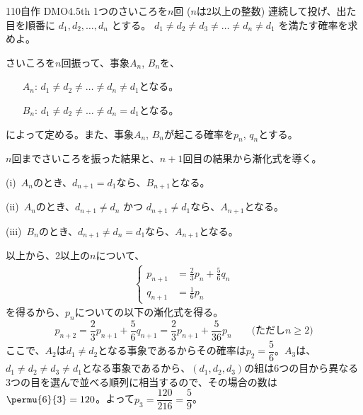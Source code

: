 \begin{thm}{110}{}{自作 DMO4.5th}
 1つのさいころを$n$回 ($n$は2以上の整数) 連続して投げ、出た目を順番に $d_1, d_2, \dots, d_n$ とする。 $d_1\neq d_2 \neq d_3 \neq \dots \neq d_n \neq d_1$ を満たす確率を求めよ。
\end{thm}

さいころを$n$回振って、事象$A_n$, $B_n$を、
\begin{itemize}
 \item[$A_n$:] $d_1\neq d_2\neq\dots\neq d_n\neq d_1$となる。 
 \item[$B_n$:] $d_1\neq d_2\neq\dots\neq d_n = d_1$となる。 
\end{itemize}
によって定める。また、事象$A_n$, $B_n$が起こる確率を$p_n$, $q_n$とする。

$n$回までさいころを振った結果と、$n+1$回目の結果から漸化式を導く。

(i)~$A_n$のとき、$d_{n+1}=d_1$なら、$B_{n+1}$となる。

(ii)~$A_n$のとき、$d_{n+1}\neq d_n$ かつ $d_{n+1}\neq d_1$なら、$A_{n+1}$となる。

(iii)~$B_n$のとき、$d_{n+1}\neq d_n = d_1$なら、$A_{n+1}$となる。

以上から、2以上の$n$について、
\begin{align*}
 \left\{
 \begin{aligned}
  p_{n+1}&=\frac{2}{3}p_n+\frac{5}{6}q_n \\
  q_{n+1}&=\frac{1}{6}p_n
 \end{aligned}
 \right.
\end{align*}
を得るから、$p_n$についての以下の漸化式を得る。
\[ p_{n+2}=\frac{2}{3}p_{n+1}+\frac{5}{6}q_{n+1}=\frac{2}{3}p_{n+1}+\frac{5}{36}p_n \qquad \text{(ただし$n\ge 2$)}\]
ここで、$A_2$は$d_1\neq d_2$となる事象であるからその確率は$p_2=\dfrac{5}{6}$。$A_3$は、$d_1\neq d_2\neq d_3\neq d_1$となる事象であるから、$(d_1, d_2, d_3)$の組は6つの目から異なる3つの目を選んで並べる順列に相当するので、その場合の数は$\permu{6}{3}=120$。よって$p_3=\dfrac{120}{216}=\dfrac{5}{9}$。

